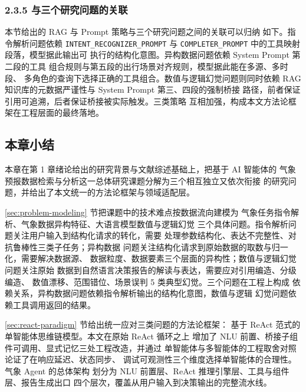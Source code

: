 \documentclass[a4paper]{article}
\theoremstyle{definition}
\theoremstyle{plain}
\theoremstyle{remark}
\newcommand{\bk}{\discretionary{}{}{}}
\begin{document}
\subsubsection*{2.3.5 \quad 与三个研究问题的关联}

本节给出的 RAG 与 Prompt 策略与三个研究问题之间的关联可以归纳
如下。指令解析问题依赖 \texttt{INTENT\_\bk{}RECOGNIZER\_\bk{}PROMPT} 与
\texttt{COMPLETER\_\bk{}PROMPT} 中的工具映射段落，模型据此输出可
执行的结构化意图。异构数据问题依赖 System Prompt 第二段的工具
组合规则与第五段的出行场景对齐规则，模型据此能在多源、多时段、
多角色的查询下选择正确的工具组合。数值与逻辑幻觉问题则同时依赖
RAG 知识库的元数据严谨性与 System Prompt 第三、四段的强制桥接
路径，前者保证引用可追溯，后者保证桥接被实际触发。三类策略
互相加强，构成本文方法论框架在工程层面的最终落地。




\subsection{本章小结}
\label{sec:problem-summary}

本章在第 1 章绪论给出的研究背景与文献综述基础上，把基于 AI 智能体的
气象预报数据检索与分析这一总体研究课题分解为三个相互独立又依次衔接
的研究问题，并给出了本文统一的方法论框架与领域适配层。

\ref{sec:problem-modeling} 节把课题中的技术难点按数据流向建模为
气象任务指令解析、气象数据异构特征、大语言模型数值与逻辑幻觉
三个具体问题。指令解析问题关注用户输入到结构化请求的转化，需要
处理参数结构化、表达不完整性、对抗鲁棒性三类子任务；异构数据
问题关注结构化请求到原始数据的取数与归一化，需要解决数据源、
数据粒度、数据要素三个层面的异构性；数值与逻辑幻觉问题关注原始
数据到自然语言决策报告的解读与表达，需要应对引用编造、分级编造、
数值漂移、范围错位、场景误判 5 类典型幻觉。三个问题在工程上构成
依赖关系，异构数据问题依赖指令解析输出的结构化意图，数值与逻辑
幻觉问题依赖工具调用返回的结果。

\ref{sec:react-paradigm} 节给出统一应对三类问题的方法论框架：
基于 ReAct 范式的单智能体思维链模型。本文在原始 ReAct 循环之上
增加了 NLU 前置、桥接子组件可调用、显式记忆三处工程改造，并通过
单智能体与多智能体的工程取舍对照论证了在响应延迟、状态同步、
调试可观测性三个维度选择单智能体的合理性。气象 Agent 的总体架构
划分为 NLU 前置层、ReAct 推理引擎层、工具与组件层、报告生成出口
四个层次，覆盖从用户输入到决策输出的完整流水线。
\end{document}
